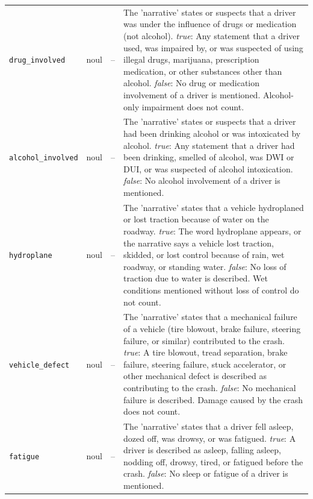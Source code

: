 \begin{small}
\begin{longtable}{lrr>{\raggedright\arraybackslash}p{267.2pt}}
\texttt{drug\_involved} & noul & -- & The 'narrative' states or suspects that a driver was under the influence of drugs or medication (not alcohol). \newline \textit{true}: Any statement that a driver used, was impaired by, or was suspected of using illegal drugs, marijuana, prescription medication, or other substances other than alcohol. \newline \textit{false}: No drug or medication involvement of a driver is mentioned. Alcohol-only impairment does not count. \\
\texttt{alcohol\_involved} & noul & -- & The 'narrative' states or suspects that a driver had been drinking alcohol or was intoxicated by alcohol. \newline \textit{true}: Any statement that a driver had been drinking, smelled of alcohol, was DWI or DUI, or was suspected of alcohol intoxication. \newline \textit{false}: No alcohol involvement of a driver is mentioned. \\
\texttt{hydroplane} & noul & -- & The 'narrative' states that a vehicle hydroplaned or lost traction because of water on the roadway. \newline \textit{true}: The word hydroplane appears, or the narrative says a vehicle lost traction, skidded, or lost control because of rain, wet roadway, or standing water. \newline \textit{false}: No loss of traction due to water is described. Wet conditions mentioned without loss of control do not count. \\
\texttt{vehicle\_defect} & noul & -- & The 'narrative' states that a mechanical failure of a vehicle (tire blowout, brake failure, steering failure, or similar) contributed to the crash. \newline \textit{true}: A tire blowout, tread separation, brake failure, steering failure, stuck accelerator, or other mechanical defect is described as contributing to the crash. \newline \textit{false}: No mechanical failure is described. Damage caused by the crash does not count. \\
\texttt{fatigue} & noul & -- & The 'narrative' states that a driver fell asleep, dozed off, was drowsy, or was fatigued. \newline \textit{true}: A driver is described as asleep, falling asleep, nodding off, drowsy, tired, or fatigued before the crash. \newline \textit{false}: No sleep or fatigue of a driver is mentioned. \\

\end{longtable}
\end{small}
